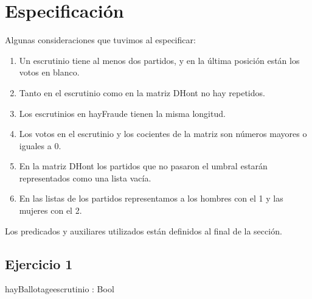 \documentclass[10pt,a4paper]{article}
\begin{document}
\maketitle

\section{Especificación}

\noindent Algunas consideraciones que tuvimos al especificar:
\begin{enumerate} \setlength\itemsep{0cm}
	\item Un escrutinio tiene al menos dos partidos, y en la última posición están los votos en blanco.
	\item Tanto en el escrutinio como en la matriz DHont no hay repetidos.
	\item Los escrutinios en hayFraude tienen la misma longitud.
	\item Los votos en el escrutinio y los cocientes de la matriz son números mayores o iguales a 0.
	\item En la matriz DHont los partidos que no pasaron el umbral estarán representados como una lista vacía.
	\item En las listas de los partidos representamos a los hombres con el 1 y las mujeres con el 2.
\end{enumerate}
Los predicados y auxiliares utilizados están definidos al final de la sección. \\

\subsection{Ejercicio 1}

\begin{proc}{hayBallotage}{\In escrutinio : \TLista{\ent}}{Bool}
\end{proc}
\end{document}
